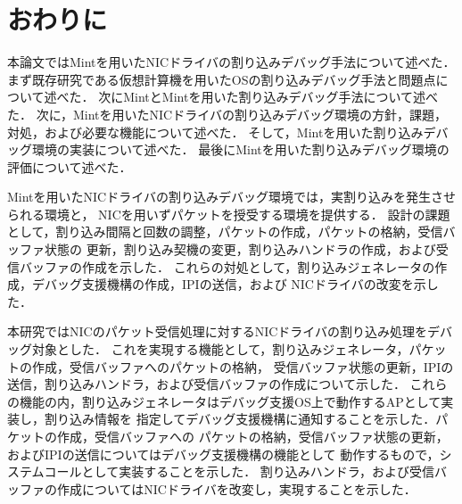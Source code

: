 \documentclass[tanilab-enum]{graduate}
\begin{document}
\chapter{おわりに}\label{conclusion}


本論文ではMintを用いたNICドライバの割り込みデバッグ手法について述べた．
まず既存研究である仮想計算機を用いたOSの割り込みデバッグ手法と問題点について述べた．
次にMintとMintを用いた割り込みデバッグ手法について述べた．
次に，Mintを用いたNICドライバの割り込みデバッグ環境の方針，課題，
対処，および必要な機能について述べた．
そして，Mintを用いた割り込みデバッグ環境の実装について述べた．
最後にMintを用いた割り込みデバッグ環境の評価について述べた．

Mintを用いたNICドライバの割り込みデバッグ環境では，実割り込みを発生させられる環境と，
NICを用いずパケットを授受する環境を提供する．
設計の課題として，割り込み間隔と回数の調整，パケットの作成，パケットの格納，受信バッファ状態の
更新，割り込み契機の変更，割り込みハンドラの作成，および受信バッファの作成を示した．
これらの対処として，割り込みジェネレータの作成，デバッグ支援機構の作成，IPIの送信，および
NICドライバの改変を示した．

本研究ではNICのパケット受信処理に対するNICドライバの割り込み処理をデバッグ対象とした．
これを実現する機能として，割り込みジェネレータ，パケットの作成，受信バッファへのパケットの格納，
受信バッファ状態の更新，IPIの送信，割り込みハンドラ，および受信バッファの作成について示した．
これらの機能の内，割り込みジェネレータはデバッグ支援OS上で動作するAPとして実装し，割り込み情報を
指定してデバッグ支援機構に通知することを示した．パケットの作成，受信バッファへの
パケットの格納，受信バッファ状態の更新，およびIPIの送信についてはデバッグ支援機構の機能として
動作するもので，システムコールとして実装することを示した．
割り込みハンドラ，および受信バッファの作成についてはNICドライバを改変し，実現することを示した．

\acknowledgment\label{acknowledgement} %
\end{document}
